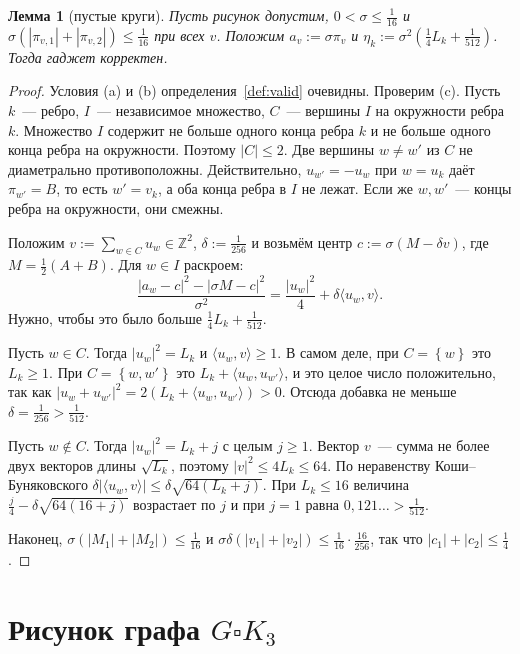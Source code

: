 \documentclass[a4paper,11pt]{article}
\theoremstyle{plain}
\newtheorem{lemma}[theorem]{Лемма}
\theoremstyle{definition}
\theoremstyle{remark}
\newcommand{\Z}{\mathbb{Z}}
\newcommand{\abs}[1]{\left\lvert #1 \right\rvert}
\newcommand{\set}[1]{\left\{ #1 \right\}}
\newcommand{\ip}[2]{\langle #1, #2\rangle}
\begin{document}
\begin{lemma}[пустые круги]\label{lem:disks}
    Пусть рисунок допустим, $0<\sigma\le\frac1{16}$ и $\sigma(\abs{\pi_{v,1}}+\abs{\pi_{v,2}})\le\frac1{16}$ при всех $v$. Положим $a_v:=\sigma\pi_v$ и $\eta_k:=\sigma^2(\frac14L_k+\frac1{512})$. Тогда гаджет корректен.
\end{lemma}

\begin{proof}
    Условия (a) и (b) определения~\ref{def:valid} очевидны. Проверим (c). Пусть $k$~--- ребро, $I$~--- независимое множество, $C$~--- вершины $I$ на окружности ребра $k$. Множество $I$ содержит не больше одного конца ребра $k$ и не больше одного конца ребра на окружности. Поэтому $\abs C\le2$. Две вершины $w\ne w'$ из $C$ не диаметрально противоположны. Действительно, $u_{w'}=-u_w$ при $w=u_k$ даёт $\pi_{w'}=B$, то есть $w'=v_k$, а оба конца ребра в $I$ не лежат. Если же $w,w'$~--- концы ребра на окружности, они смежны.

    Положим $v:=\sum_{w\in C}u_w\in\Z^2$, $\delta:=\frac1{256}$ и возьмём центр $c:=\sigma(M-\delta v)$, где $M=\frac12(A+B)$. Для $w\in I$ раскроем:
    \[
        \frac{\abs{a_w-c}^2-\abs{\sigma M-c}^2}{\sigma^2}=\frac{\abs{u_w}^2}4+\delta\ip{u_w}{v}.
    \]
    Нужно, чтобы это было больше $\frac14L_k+\frac1{512}$.

    Пусть $w\in C$. Тогда $\abs{u_w}^2=L_k$ и $\ip{u_w}{v}\ge1$. В самом деле, при $C=\set w$ это $L_k\ge1$. При $C=\set{w,w'}$ это $L_k+\ip{u_w}{u_{w'}}$, и это целое число положительно, так как $\abs{u_w+u_{w'}}^2=2(L_k+\ip{u_w}{u_{w'}})>0$. Отсюда добавка не меньше $\delta=\frac1{256}>\frac1{512}$.

    Пусть $w\notin C$. Тогда $\abs{u_w}^2=L_k+j$ с целым $j\ge1$. Вектор $v$~--- сумма не более двух векторов длины $\sqrt{L_k}$, поэтому $\abs v^2\le4L_k\le64$. По неравенству Коши--Буняковского $\delta\abs{\ip{u_w}{v}}\le\delta\sqrt{64(L_k+j)}$. При $L_k\le16$ величина $\frac j4-\delta\sqrt{64(16+j)}$ возрастает по $j$ и при $j=1$ равна $0{,}121\ldots>\frac1{512}$.

    Наконец, $\sigma(\abs{M_1}+\abs{M_2})\le\frac1{16}$ и $\sigma\delta(\abs{v_1}+\abs{v_2})\le\frac1{16}\cdot\frac{16}{256}$, так что $\abs{c_1}+\abs{c_2}\le\frac14$.
\end{proof}

\section{Рисунок графа $G\square K_3$}\label{sec:layout}
\end{document}
